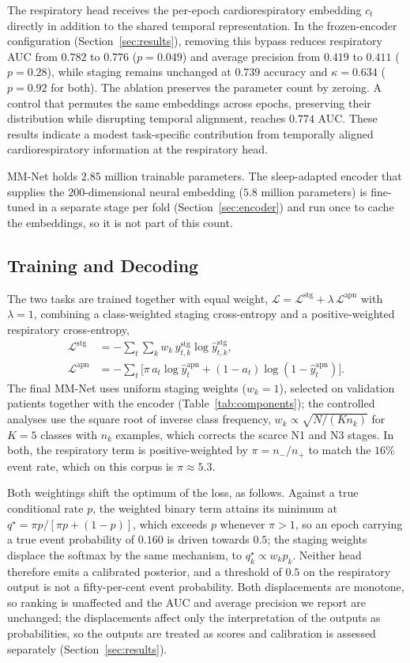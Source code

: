 \documentclass[a4paper,fleqn]{cas-sc}
\newcommand{\fzAuc}{0.782}
\newcommand{\fzAp}{0.419}
\begin{document}
The respiratory head receives the per-epoch cardiorespiratory embedding $c_t$
directly in addition to the shared temporal representation. In the frozen-encoder
configuration (Section~\ref{sec:results}), removing this bypass
reduces respiratory AUC from $\fzAuc$ to $0.776$ ($p=0.049$) and average
precision from $\fzAp$ to $0.411$ ($p=0.28$), while staging remains unchanged
at $0.739$ accuracy and $\kappa=0.634$ ($p=0.92$ for both). The ablation
preserves the parameter count by zeroing. A control that permutes the same embeddings across
epochs, preserving their distribution while disrupting temporal alignment,
reaches $0.774$ AUC. These results indicate a modest task-specific contribution
from temporally aligned cardiorespiratory information at the respiratory head.


MM-Net holds $2.85$ million trainable parameters. The sleep-adapted encoder that supplies
the $200$-dimensional neural embedding ($5.8$ million parameters) is fine-tuned in a separate
stage per fold (Section~\ref{sec:encoder}) and run once to cache the embeddings, so it is not
part of this count.

\subsection{Training and Decoding}
\label{sec:training}
The two tasks are trained together with equal weight, $\mathcal{L}=\mathcal{L}^{\mathrm{stg}}+\lambda\,\mathcal{L}^{\mathrm{apn}}$ with $\lambda=1$, combining a class-weighted staging cross-entropy and a positive-weighted respiratory cross-entropy,
\begin{align}
\mathcal{L}^{\mathrm{stg}}&=-\sum_t\sum_{k}w_k\,y^{\mathrm{stg}}_{t,k}\log\hat y^{\mathrm{stg}}_{t,k},\\
\mathcal{L}^{\mathrm{apn}}&=-\sum_t\big[\pi\,a_t\log\hat y^{\mathrm{apn}}_t+(1-a_t)\log(1-\hat y^{\mathrm{apn}}_t)\big].
\end{align}
The final MM-Net uses uniform staging weights ($w_k=1$), selected on validation patients
together with the encoder (Table~\ref{tab:components}); the controlled analyses use the
square root of inverse class frequency,
$w_k\propto\sqrt{N/(K n_k)}$ for $K=5$ classes with $n_k$ examples, which corrects the scarce
N1 and N3 stages. In both, the respiratory term is
positive-weighted by $\pi=n_-/n_+$ to match the $16\%$ event rate, which on this corpus is
$\pi\approx5.3$.

Both weightings shift the optimum of the loss, as follows. Against a true conditional rate $p$, the weighted binary term attains its minimum at $q^{\star}=\pi p/[\pi p+(1-p)]$, which exceeds $p$ whenever $\pi>1$, so an epoch carrying a true event probability of $0.160$ is driven towards $0.5$; the staging weights displace the softmax by the same mechanism, to $q^{\star}_k\propto w_k p_k$. Neither head therefore emits a calibrated posterior, and a
threshold of $0.5$ on the respiratory output is not a fifty-per-cent event probability. Both displacements are monotone, so ranking is unaffected and the AUC and average precision we report are unchanged; the displacements affect only the interpretation of the outputs as probabilities, so the outputs are treated as scores and calibration is assessed separately (Section~\ref{sec:results}).
\end{document}
